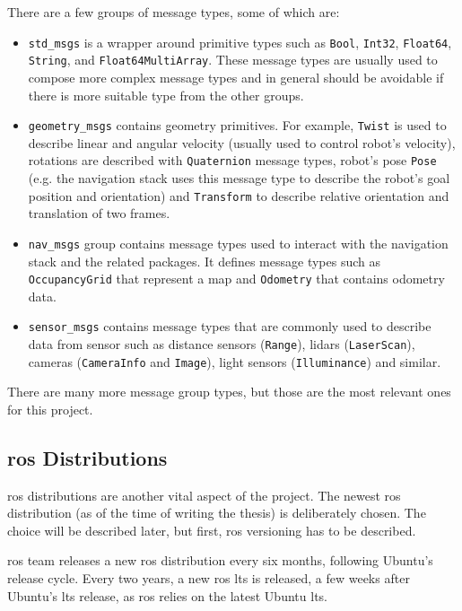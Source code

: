 There are a few groups of message types, some of which are:
\begin{itemize}
    \item \texttt{std\_msgs} is a wrapper around primitive types such as \texttt{Bool}, \texttt{Int32}, \texttt{Float64}, \texttt{String}, and \texttt{Float64MultiArray}.
    These message types are usually used to compose more complex message types and in general should be avoidable if there is more suitable type from the other groups.
    \item \texttt{geometry\_msgs} contains geometry primitives.
    For example, \texttt{Twist} is used to describe linear and angular velocity (usually used to control robot's velocity), rotations are described with \texttt{Quaternion} message types, robot's pose \texttt{Pose} (e.g. the navigation stack uses this message type to describe the robot's goal position and orientation) and \texttt{Transform} to describe relative orientation and translation of two frames.
    \item \texttt{nav\_msgs} group contains message types used to interact with the navigation stack and the related packages.
    It defines message types such as \texttt{OccupancyGrid} that represent a map and \texttt{Odometry} that contains odometry data. 
    \item \texttt{sensor\_msgs} contains message types that are commonly used to describe data from sensor such as distance sensors (\texttt{Range}), \acsp{lidar} (\texttt{LaserScan}), cameras (\texttt{CameraInfo} and \texttt{Image}), light sensors (\texttt{Illuminance}) and similar. 
\end{itemize}

There are many more message group types, but those are the most relevant ones for this project.

\subsection{\ac{ros} Distributions}

\ac{ros} distributions are another vital aspect of the project.
The newest \ac{ros} distribution (as of the time of writing the thesis) is deliberately chosen.
The choice will be described later, but first, \ac{ros} versioning has to be described.

\ac{ros} team releases a new \ac{ros} distribution every six months, following Ubuntu's release cycle.
Every two years, a new \ac{ros} \ac{lts} is released,
a few weeks after Ubuntu's \ac{lts} release, as \ac{ros} relies on the latest Ubuntu \ac{lts}.

